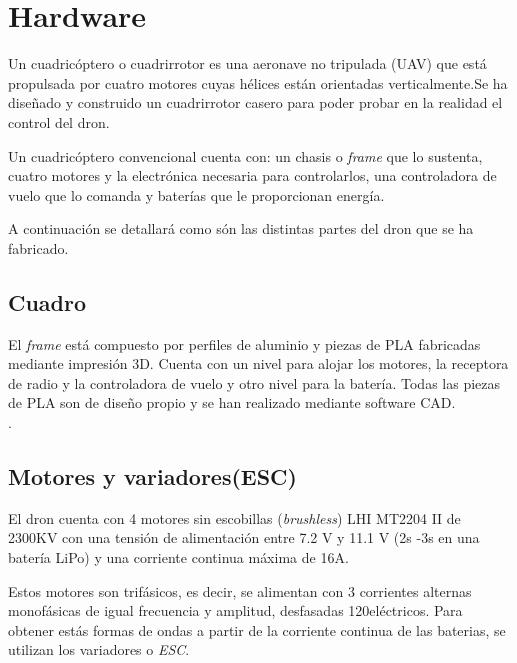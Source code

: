 \chapter{Hardware}
Un cuadricóptero o cuadrirrotor es una aeronave no tripulada (UAV) que está propulsada por cuatro motores cuyas hélices están orientadas verticalmente.Se ha diseñado y construido un cuadrirrotor casero para poder probar en la realidad el control del dron. 

Un cuadricóptero convencional cuenta con: un chasis o \textit{frame} que lo sustenta, cuatro motores y la electrónica necesaria para controlarlos, una controladora de vuelo que lo comanda y baterías que le proporcionan energía.

A continuación se detallará como són las distintas partes del dron que se ha fabricado.
\section{Cuadro}
El \textit{frame} está compuesto por perfiles de aluminio y piezas de PLA fabricadas mediante impresión 3D. Cuenta con un nivel para alojar los motores, la receptora de radio y la controladora de vuelo y otro nivel para la batería. Todas las piezas de PLA son de diseño propio y se han realizado mediante software CAD.\\


.
\section{Motores y variadores(ESC)}
El dron cuenta con 4 motores sin escobillas (\textit{brushless}) LHI MT2204 II de 2300KV con una tensión de alimentación entre 7.2 V y 11.1 V (2s -3s en una batería LiPo) y una corriente continua máxima de 16A.


Estos motores son trifásicos, es decir, se alimentan con 3 corrientes alternas monofásicas de igual frecuencia y amplitud, desfasadas 120\grad \;eléctricos. Para obtener estás formas de ondas a partir de la corriente continua de las baterias, se utilizan los variadores o \textit{ESC}.\\


